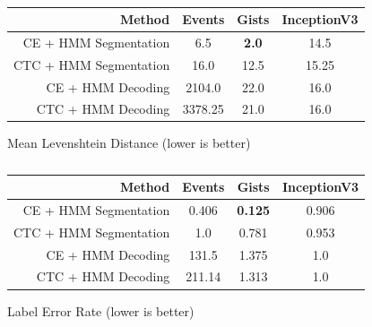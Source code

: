 \begin{table}
  \centering
  \begin{subtable}{\textwidth}
    \centering
    \begin{tabular}{r|c|c|c}
Method & Events & Gists & InceptionV3\\
\hline
CE + HMM Segmentation & 6.5 & \textbf{2.0} & 14.5\\
CTC + HMM Segmentation & 16.0 & 12.5 & 15.25\\
CE + HMM Decoding & 2104.0 & 22.0 & 16.0\\
CTC + HMM Decoding & 3378.25 & 21.0 & 16.0\\
    \end{tabular}
    \caption{Mean Levenshtein Distance (lower is better)}
  \end{subtable}
  \par\bigskip
  \begin{subtable}{\textwidth}
    \centering
    \begin{tabular}{r|c|c|c}
Method & Events & Gists & InceptionV3\\
\hline
CE + HMM Segmentation & 0.406 & \textbf{0.125} & 0.906\\
CTC + HMM Segmentation & 1.0 & 0.781 & 0.953\\
CE + HMM Decoding & 131.5 & 1.375 & 1.0\\
CTC + HMM Decoding & 211.14 & 1.313 & 1.0\\
    \end{tabular}
    \caption{Label Error Rate (lower is better)}
  \end{subtable}
  \caption{}
  \label{tab:}
\end{table}


